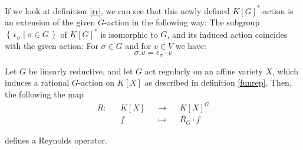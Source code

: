 \begin{remark}
  If we look at definition \ref{rr}, we can see that this newly defined $K[G]^\ast$-action is an extension of the given $G$-action in the following way:
  The subgroup $\left\{\, \epsilon_\sigma \mid \sigma \in G \,\right\}$ of $K[G]^\ast$ is isomorphic to $G$, and its induced action coincides with the given action:
  For $\sigma \in G$ and for $v \in V$ we have:
  \begin{equation}
    \sigma . v = \epsilon_\sigma \cdot v
  \end{equation}
\end{remark}


\begin{theorem}\label{ro}
  Let $G$ be linearly reductive, and let $G$ act regularly on an affine variety $X$, which induces a rational $G$-action on $K[X]$ as described in definition \ref{funrep}.
  Then, the following the map
  \begin{equation}
    \begin{aligned}
      R \colon &&K[X] &&\longrightarrow&& K[X]^G  \\
      && f&& \longmapsto&& R_G \cdot f
    \end{aligned}
  \end{equation}

  defines a Reynolds operator.
\end{theorem}

